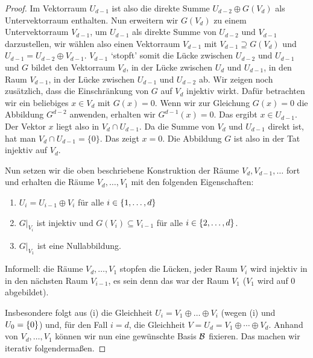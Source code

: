\begin{proof}
	Im Vektorraum $U_{d-1}$ ist also die direkte Summe $U_{d-2} \oplus G(V_d)$ als Untervektorraum enthalten. Nun erweitern wir $G(V_d)$ zu einem Untervektorraum $V_{d-1}$, um $U_{d-1}$ als direkte Summe von $U_{d-2}$ und $V_{d-1}$ darzustellen, wir wählen also einen Vektorraum $V_{d-1}$ mit $V_{d-1} \supseteq G(V_d)$ und $U_{d-1} = U_{d-2} \oplus V_{d-1}$. $V_{d-1}$ `stopft' somit die Lücke zwischen $U_{d-2}$ und $U_{d-1}$ und $G$ bildet den Vektorraum $V_d$, in der Lücke zwischen $U_d$ und $U_{d-1}$, in den Raum $V_{d-1}$, in der Lücke zwischen $U_{d-1}$ und $U_{d-2}$ ab. Wir zeigen noch zusätzlich, dass die Einschränkung von $G$ auf $V_d$ injektiv wirkt. Dafür betrachten wir ein beliebiges $x \in V_d$ mit $G(x) = 0$. Wenn wir zur Gleichung $G(x) =0$ die Abbildung $G^{d-2}$ anwenden, erhalten wir $G^{d-1} (x) =0$. Das ergibt $x \in U_{d-1}$. Der Vektor $x$ liegt also in $V_d \cap U_{d-1}$. Da die Summe von $V_d$ und $U_{d-1}$ direkt ist, hat man $V_d \cap U_{d-1} =\{0\}$. Das zeigt $x=0$. Die Abbildung $G$ ist also in der Tat injektiv auf $V_d$. 
	
	Nun setzen wir die oben beschriebene Konstruktion der Räume $V_d, V_{d-1},\ldots$ fort und erhalten die Räume $V_d,\ldots,V_1$ mit den folgenden Eigenschaften: 
	\begin{enumerate}
		\item
		$ U_i = U_{i-1} \oplus V_i $ für alle $ i \in \{ 1,\ldots,d \} $
		\item
		$ G|_{V_i} $ ist injektiv und $ G(V_i) \subseteq V_{i-1} $ für alle $ i \in \{ 2,\ldots,d \} $.
		\item
		$ G|_{V_1} $ ist eine Nullabbildung.
	\end{enumerate}
	Informell: die Räume $V_d,\ldots,V_1$ stopfen die Lücken, jeder Raum $V_i$ wird injektiv in in den nächsten Raum $V_{i-1}$, es sein denn das war der Raum $V_1$ ($V_1$ wird auf $0$ abgebildet). 
	
	Insbesondere folgt aus (i) die Gleichheit $ U_i = V_1 \oplus \ldots \oplus V_i $ (wegen (i) und $ U_0 = \left\{ 0 \right\} $) und, für den Fall $ i = d $, die Gleichheit $ V = U_d = V_1 \oplus \cdots \oplus V_d $. Anhand von $V_d,\ldots,V_1$ können wir nun eine gewünschte Basis $\mathcal{B}$ fixieren. Das machen wir iterativ folgendermaßen. 
	

\end{proof}
